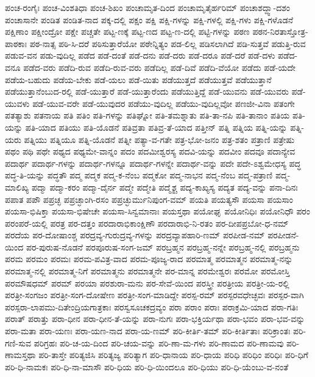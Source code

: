 {ಪಂಚ-ರಂಗೈಃ
ಪಂಚ-ವಿಂಶತಿಧಾ
ಪಂಚ-ಶಿಖಂ
ಪಂಚಾಮೃತ-ದಿಂದ
ಪಂಚಾಮೃತೈರ್ಹರಿಮ್
ಪಂಚಾಶದ್ದ್ವಾ-ದಶಂ
ಪಂಚಾಸಾನೇ
ಪಂಡಿತ
ಪಂಡಿತ-ನಾದ
ಪಕ್ಕ-ದಲ್ಲಿ
ಪಕ್ಷಂ
ಪಕ್ಷಿ
ಪಕ್ಷಿ-ಗಳನ್ನು
ಪಕ್ಷಿ-ಗಳಲ್ಲಿ
ಪಕ್ಷಿ-ಗಳು
ಪಕ್ಷಿ-ಗಳೊಡನೆ
ಪಕ್ಷಿಣಾಂ
ಪಕ್ಷೀಂದ್ರೋ
ಪಕ್ಷೇ
ಪಚ್ಚತೇ
ಪಟ್ಟ-ಣಕ್ಕೆ
ಪಟ್ಟ-ಣದ
ಪಟ್ಟ-ಣ-ದಲ್ಲಿ
ಪಟ್ಟಿ-ಗಳನ್ನು
ಪಠಣ
ಪಠನ-ನಿರತಾಸ್ತೋತ್ರ-ಪಾಠಕಾಃ
ಪಠ-ನಾತ್ಸ
ಪಠಿ-ಸಿ-ದರೆ
ಪಠಿಸುತ್ತಾರೆಯೋ
ಪಠೇನ್ನಿತ್ಯಂ
ಪಡ-ಲಿಲ್ಲ
ಪಡಿಸಲಾಗಿದೆ
ಪಡಿ-ಸುತ್ತವೆ
ಪಡುತ್ತಿ-ರುವ
ಪಡುವ-ವನ
ಪಡು-ವುದಿಲ್ಲ
ಪಡೆದ
ಪಡೆ-ದಂತೆ
ಪಡೆ-ದನು
ಪಡೆ-ದರು
ಪಡೆ-ದರೂ
ಪಡೆ-ದರೆ
ಪಡೆ-ದಳು
ಪಡೆದ-ವನೂ
ಪಡೆದ-ವರು
ಪಡೆದಿ-ರುವ
ಪಡೆದಿ-ರುವ-ವರು
ಪಡೆದಿಲ್ಲ
ಪಡೆ-ದಿವೆ
ಪಡೆದಿ-ವೆಯೋ
ಪಡೆದು
ಪಡೆ-ಯದೇ
ಪಡೆಯ-ಬಹುದು
ಪಡೆಯ-ಬೇಕು
ಪಡೆ-ಯಲು
ಪಡೆ-ಯಿತು
ಪಡೆಯುತ್ತದೆ
ಪಡೆಯುತ್ತವೆ
ಪಡೆಯುತ್ತಾನೆ
ಪಡೆಯುತ್ತಾನೆಂಬುದ-ರಲ್ಲಿ
ಪಡೆ-ಯುತ್ತಾರೆ
ಪಡೆ-ಯುತ್ತಾರೆಂದು
ಪಡೆಯುತ್ತಿದ್ದೆ
ಪಡೆ-ಯುವನು
ಪಡೆ-ಯುವರು
ಪಡೆ-ಯುವಳು
ಪಡೆ-ಯುವ-ವರೇ
ಪಡೆ-ಯುವುದರ
ಪಡೆಯು-ವುದಿಲ್ಲ
ಪಡೆಯು-ವುದಿಲ್ಲವೋ
ಪಣಜೀ-ವಿನಾ
ಪತಂಗೇ
ಪತತ್ಯಾಶು
ಪತನಾಯ
ಪತಿ
ಪತಿಂ
ಪತಿ-ಗಳನ್ನು
ಪತಿಘ್ನೋ
ಪತಿ-ತಮಶ್ನಾತು
ಪತಿ-ತಾ-ನಪಿ
ಪತಿ-ತಾನಾಂ
ಪತಿಯ
ಪತಿ-ಯನ್ನು
ಪತಿ-ಯಾದ
ಪತಿಯು
ಪತಿ-ಯೊಡನೆ
ಪತಿವ್ರತಾ
ಪತಿವ್ರ-ತೆ-ಯಾದ
ಪತ್ತೀನ್
ಪತ್ನಿ
ಪತ್ನಿಯ
ಪತ್ನಿ-ಯನ್ನು
ಪತ್ನಿ-ಯರು
ಪತ್ನಿಯು
ಪತ್ನಿಯೂ
ಪತ್ನಿ-ಯೊಡನೆ
ಪತ್ನೀ
ಪತ್ಯಾ-ವ-ಗತೇ
ಪತ್ರ-ಭೋ-ಜನಂ
ಪತ್ರ-ಶತಂ
ಪತ್ರಾಣಿ
ಪತ್ರೇಷು
ಪಥಂ
ಪಥಿ
ಪಥೇ
ಪಥ್ಯದ
ಪಥ್ಯಮೇ-ವಾನ್ನಂ
ಪದಂ
ಪದಮೀಶ್ವರಸ್ಯ
ಪದವಿ-ಯನ್ನು
ಪದವೀಂ
ಪದವೂ
ಪದಾನ್ಯೇವ
ಪದಾರ್ಥ
ಪದಾರ್ಥ-ಗಳನ್ನು
ಪದಾರ್ಥ-ಗಳನ್ನೂ
ಪದಾರ್ಥ-ಗಳನ್ನೇ
ಪದಾರ್ಥ-ವನ್ನು
ಪದೇ
ಪದೇ-ಽಶ್ವಮೇಧಸ್ಯ
ಪದ್ಧ
ಪದ್ಧ-ತಿ-ಯನ್ನು
ಪದ್ಧತೌ
ಪದ್ಮ
ಪದ್ಮಕ
ಪದ್ಮ-ಕ-ನೆಂಬ
ಪದ್ಮಕೋ
ಪದ್ಮ-ನಾಭನ
ಪದ್ಮ-ನೆಂಬ
ಪದ್ಮ-ಪತ್ರಾಣಿ
ಪದ್ಮ-ಮಾಲಿಖ್ಯ
ಪದ್ಮಾ
ಪದ್ಮಾ-ಕರಂ
ಪದ್ಮಾ-ದೈರ್ನ
ಪದ್ಮೇ
ಪದ್ಮೇತಿ
ಪದ್ಮೈಶ್ಚ
ಪದ್ಯ-ಕಾಖ್ಯಸ್ಯ
ಪದ್ಯತ
ಪದ್ಯ-ವನ್ನು
ಪನಾ-ದಿನಃ
ಪಪಾತ
ಪಪೌ
ಪಪ್ರಚ್ಛ
ಪಪ್ರಚ್ಛಾಂಗಿ-ರಸಂ
ಪಪ್ರಚ್ಛುರ್ಮುನಿಪುಂಗ-ವಮ್
ಪಯತಿ
ಪಯತ್ಯಸೌ
ಪಯಸಾ
ಪಯಸಾಂ
ಪಯಸಾ-ಭಿಷಿಕ್ತಾ
ಪಯಸಾ-ಭಿಷೇಚೇ
ಪಯಸಾ-ಸಿನ್ವಮಾನಾಃ
ಪಯಸ್ತಥಾ
ಪಯೋಘೃ
ಪಯೋನಿಧಿಃ
ಪಯೋನಿಧೌ
ಪರಂ
ಪರಂಪರೆ-ಯಲ್ಲಿ
ಪರತ್ರ
ಪರ-ದತ್ತಂ
ಪರದಾರಾಭಿಕಾಂಕ್ಷಿಣೌ
ಪರದಾರಾಭಿ-ನಿ-ರತಂ
ಪರ-ದೀಪಪ್ರಬೋ-ಧ-ನಮ್
ಪರದೆಯ
ಪರ-ದೋಷಾಂಶ್ಚ
ಪರದ್ರವ್ಯ-ಗುರುದ್ರವ್ಯ-ಗಳನ್ನು
ಪರದ್ರವ್ಯಾಪಹಾರಿ-ಣಮ್
ಪರಪೀಡ-ನಮ್
ಪರಪೀಡನೆ-ಯಿಂದ
ಪರ-ಪುರುಷ-ನೊಡನೆ
ಪರಪೂರುಷ-ಸಂಗ-ಜಮ್
ಪರಬ್ರಹ್ಮನ
ಪರಬ್ರಹ್ಮ-ನನ್ನೇ
ಪರಬ್ರಹ್ಮ-ನಲ್ಲಿ
ಪರಬ್ರಹ್ಮನು
ಪರಮ
ಪರಮಂ
ಪರಮಃ
ಪರಮ-ಪವಿತ್ರ-ವಾದ
ಪರಮ-ಪೂಜ್ಯ-ರಾದ
ಪರಮಾತ್ಮ
ಪರಮಾತ್ಮನ
ಪರಮಾತ್ಮ-ನನ್ನು
ಪರಮಾತ್ಮ-ನಲ್ಲಿ
ಪರಮಾತ್ಮ-ನಿಗೆ
ಪರಮಾತ್ಮನು
ಪರಮಾತ್ಮನೇ
ಪರ-ಮಾನ್ನ
ಪರಮೇಶ್ವರಃ
ಪರಮೋ
ಪರಮೋಸ್ತಿ
ಪರಮೌಷಧಮ್
ಪರಮ್
ಪರಯಾ
ಪರಶುರಾ-ಮನು
ಪರ-ಸೇವೆ-ಯಿಂದ
ಪರಸ್ತ್ರೀ
ಪರತ್ರೀಯ
ಪರತ್ರೀ-ಯ-ರಲ್ಲಿ
ಪರತ್ರೀ-ಸಂಗಜಂ
ಪರತ್ರೀ-ಸಂಗ-ದೋಷೇಣ
ಪರತ್ರೀ-ಸಂಗ-ಮಾಡಿದ್ದೇ
ಪರಸ್ಪ-ರಮ್
ಪರಸ್ಪರವಧೇಚ್ಛವಃ
ಪರಸ್ಪರ-ವಾಗಿ
ಪರಸ್ಪರಾ-ಲಾಪಮು-ದಿತೇಂದ್ರಿಯಗಾತ್ರಕಾಃ
ಪರಸ್ವಸೂಚಕದ್ರವ್ಯಂ
ಪರಾ
ಪರಾಂ
ಪರಾಃ
ಪರಾಕ್ರಮಿ-ಯಾದ
ಪರಾ-ಗತಿಃ
ಪರಾತ್
ಪರಾತ್ತು
ಪರಾ-ಧೀನ
ಪರಾ-ಧೀನ-ತೆ-ಯನ್ನು
ಪರಾ-ನುಗಃ
ಪರಾ-ಭಕ್ತಿರ್ಯಥಾ
ಪರಾ-ಭವಂ
ಪರಾ-ಭವ-ವನ್ನು
ಪರಾ-ಮತಾ
ಪರಾ-ಯಣಃ
ಪರಾ-ಯಣ-ನಾದ
ಪರಾ-ಯ-ಣಮ್
ಪರಿ-ಕೀರ್ತಿ-ತಮ್
ಪರಿ-ಕೀರ್ತಿತಾಃ
ಪರಿಕ್ರಾಂತಃ
ಪರಿ-ಗಣಿ-ಸುವ
ಪರಿಗ್ರಹಃ
ಪರಿ-ಚ-ಯ-ದಿಂದ
ಪರಿ-ಚಯ-ವನ್ನು
ಪರಿ-ಣಾ-ಮ-ಗಳು
ಪರಿ-ಣಾಮದ
ಪರಿ-ಣಾಮವು
ಪರಿ-ಣಾಮಸ್ತಥಾ
ಪರಿ-ತಾಸ್ತೇ
ಪರಿತ್ಯಜಿಸಿ
ಪರಿತ್ಯಜ್ಯ
ಪರಿತ್ಯಾಗ
ಪರಿ-ಧಾನಾಯ
ಪರಿ-ಧಾಯ
ಪರಿಧಿ
ಪರಿಧಿಂ
ಪರಿಧಿಃ
ಪರಿ-ಧಿಗೆ
ಪರಿ-ಧಿ-ನಾಮಕಃ
ಪರಿ-ಧಿ-ನಾ-ಮಾಸೌ
ಪರಿ-ಧಿಯ
ಪರಿ-ಧಿ-ಯಿಂದಲೂ
ಪರಿ-ಧಿಯು
ಪರಿ-ಧಿ-ಯೆಂಬು-ವ-ನಂತೆ
}

